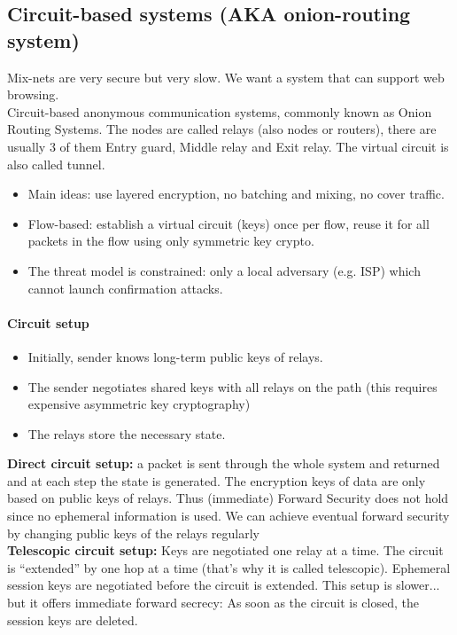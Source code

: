 \subsection{Circuit-based systems (AKA onion-routing system)}
Mix-nets are very secure but very slow. We want a system that can support web browsing.\\
Circuit-based anonymous communication systems, commonly known as Onion Routing Systems. The nodes are called relays (also nodes or routers), there are usually 3 of them Entry guard, Middle relay and Exit relay. The virtual circuit is also called tunnel.
\begin{itemize}
    \item Main ideas: use layered encryption, no batching and mixing, no cover traffic.
    \item Flow-based: establish a virtual circuit (keys) once per flow, reuse it for all packets in the flow using only symmetric key crypto.
    \item The threat model is constrained: only a local adversary (e.g. ISP) which cannot launch confirmation attacks.
\end{itemize}

\paragraph{Circuit setup}
\begin{itemize}
    \item Initially, sender knows long-term public keys of relays.
    \item The sender negotiates shared keys with all relays on the path (this requires expensive asymmetric key cryptography)
    \item The relays store the necessary state.
\end{itemize}
\textbf{Direct circuit setup:} a packet is sent through the whole system and returned and at each step the state is generated. The encryption keys of data are only based on public keys of relays. Thus (immediate) Forward Security does not hold since no ephemeral information is used. We can achieve eventual forward security by changing public keys of the relays regularly \\
\textbf{Telescopic circuit setup:} Keys are negotiated one relay at a time. The circuit is “extended” by one hop at a time (that’s why it is called telescopic). Ephemeral session keys are negotiated before the circuit is extended. This setup is slower... but it offers immediate forward secrecy: As soon as the circuit is closed, the session keys are deleted.


